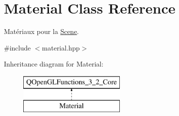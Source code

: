 \hypertarget{class_material}{\section{Material Class Reference}
\label{class_material}
}


Matériaux pour la \hyperlink{class_scene}{Scene}.  




{\ttfamily \#include $<$material.\+hpp$>$}

Inheritance diagram for Material\+:\begin{figure}[H]
\begin{center}
\leavevmode
\includegraphics[height=2.000000cm]{class_material}
\end{center}
\end{figure}

